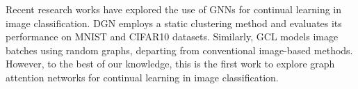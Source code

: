Recent research works have explored the use of GNNs for continual learning in image classification. DGN \cite{Carta2021CatastrophicFI_dgn} employs a static clustering method and evaluates its performance on MNIST and CIFAR10 datasets. Similarly, GCL \cite{tang2021graphbased_gcl} models image batches using random graphs, departing from conventional image-based methods. However, to the best of our knowledge, this is the first work to explore graph attention networks for continual learning in image classification.